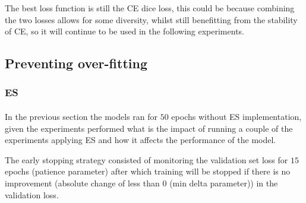 The best loss function is still the \gls{CE} dice loss, this could be because combining the two losses allows for some diversity, whilst still benefitting from the stability of \gls{CE}, so it will continue to be used in the following experiments.


\subsection{Preventing over-fitting} \label{regularisation_sec}
\subsubsection{\gls{ES}}
\paragraph{}
In the previous section the models ran for $50$ epochs without \gls{ES} implementation, given the experiments performed what is the impact of running a couple of the experiments applying \gls{ES} and how it affects the performance of the model.

The early stopping strategy consisted of monitoring the validation set loss for $15$ epochs (patience parameter) after which training will be stopped if there is no improvement (absolute change of less than $0$ (min delta parameter)) in the validation loss.

